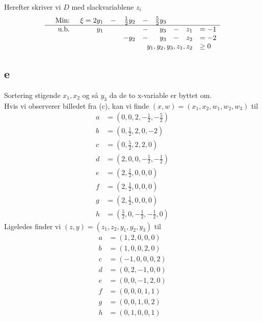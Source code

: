 \documentclass[a4paper]{article}
\begin{document}
Herefter skriver vi $D$ med slackvariablene $z_i$
\begin{equation}
\begin{array}{rrrrrrrrrl}
&\text{Min: } &\xi=2y_1 &- &\frac{1}{2}y_2 &- &\frac{5}{2}y_3 & \\
\hline
&\text{u.b. } &y_1 & & &- &y_3 &- &z_1 &= -1 \\
& & & &-y_2 &- &y_3 &- &z_2 &= -2 \\
& & & &\multicolumn{5}{r} {y_1,y_2,y_3,z_1,z_2} &\geq 0
\end{array}
\end{equation}

\subsection*{e}
Sortering stigende $x_1,x_2$ og så $y_3$ da de to x-variable er byttet om. \\
Hvis vi observerer billedet fra (c), kan vi finde $(x,w)=(x_1,x_2,w_1,w_2,w_3)$ til
\begin{align*}
a&=\left(0,0,2,-\frac{1}{2},-\frac{5}{2}\right) \\
b&=\left(0,\frac{1}{2},2,0,-2\right) \\
c&=\left(0,\frac{5}{2},2,2,0\right) \\
d&=\left(2,0,0,-\frac{1}{2},-\frac{1}{2}\right) \\
e&=\left(2,\frac{1}{2},0,0,0\right) \\
f&=\left(2,\frac{1}{2},0,0,0\right) \\
g&=\left(2,\frac{1}{2},0,0,0\right) \\
h&=\left(\frac{5}{2},0,-\frac{1}{2},-\frac{1}{2},0\right)
\end{align*}
Ligeledes finder vi $(z,y)=(z_1,z_2,y_1,y_2,y_3)$ til
\begin{align*}
a&=\left(1,2,0,0,0\right) \\
b&=\left(1,0,0,2,0\right) \\
c&=\left(-1,0,0,0,2\right) \\
d&=\left(0,2,-1,0,0\right) \\
e&=\left(0,0,-1,2,0\right) \\
f&=\left(0,0,0,1,1\right) \\
g&=\left(0,0,1,0,2\right) \\
h&=\left(0,1,0,0,1\right)
\end{align*}
\end{document}
